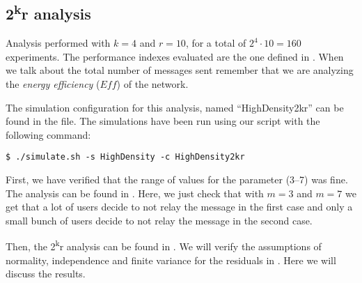 \subsection{2\texorpdfstring{\textsuperscript{k}}{k}r analysis}\label{subsec:hd2kr}

Analysis performed with \(k\!=\!4\) and \(r\!=\!10\), for a total of \(2^4 \cdot
10 \!=\!160\) experiments. The performance indexes evaluated are the one defined
in . When we talk about the total number of messages sent
remember that we are analyzing the \emph{energy efficiency} (\(\mathit{Eff}\))
of the network.

The simulation configuration for this analysis, named ``HighDensity2kr'' can be
found in the  file. The simulations have been run using
our  script with the following command:
\begin{verbatim}
$ ./simulate.sh -s HighDensity -c HighDensity2kr
\end{verbatim}

First, we have verified that the range of values for the 
parameter (3--7) was fine. The analysis can be found in .
Here, we just check that with \(m\!=\!3\) and \(m\!=\!7\) we get that a lot of
users decide to not relay the message in the first case and only a small bunch
of users decide to not relay the message in the second case.

Then, the 2\textsuperscript{k}r analysis can be found in . We
will verify the assumptions of normality, independence and finite variance for
the residuals in . Here we will discuss the
results.






